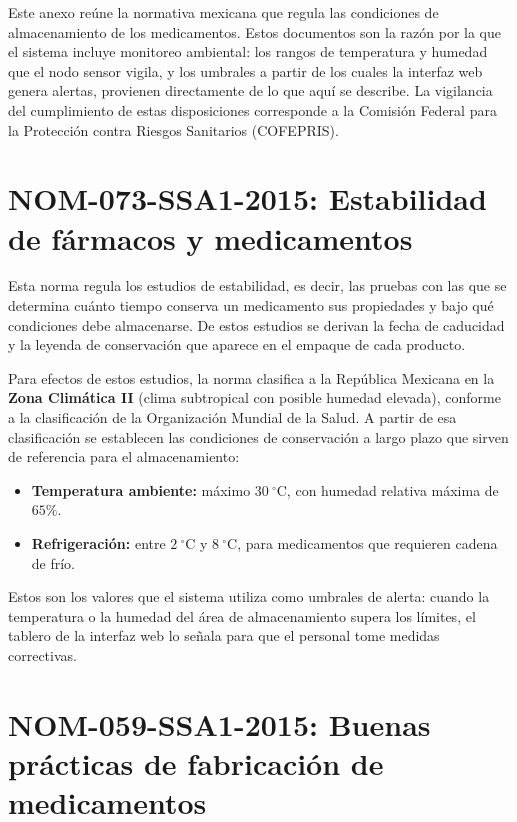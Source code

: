 
\renewcommand{\thesection}{A2.\arabic{section}}
\setcounter{section}{0}

Este anexo reúne la normativa mexicana que regula las condiciones de almacenamiento de los medicamentos. Estos documentos son la razón por la que el sistema incluye monitoreo ambiental: los rangos de temperatura y humedad que el nodo sensor vigila, y los umbrales a partir de los cuales la interfaz web genera alertas, provienen directamente de lo que aquí se describe. La vigilancia del cumplimiento de estas disposiciones corresponde a la Comisión Federal para la Protección contra Riesgos Sanitarios (COFEPRIS).

\section{NOM-073-SSA1-2015: Estabilidad de fármacos y medicamentos}

Esta norma \cite{nom073} regula los estudios de estabilidad, es decir, las pruebas con las que se determina cuánto tiempo conserva un medicamento sus propiedades y bajo qué condiciones debe almacenarse. De estos estudios se derivan la fecha de caducidad y la leyenda de conservación que aparece en el empaque de cada producto.

Para efectos de estos estudios, la norma clasifica a la República Mexicana en la \textbf{Zona Climática II} (clima subtropical con posible humedad elevada), conforme a la clasificación de la Organización Mundial de la Salud. A partir de esa clasificación se establecen las condiciones de conservación a largo plazo que sirven de referencia para el almacenamiento:

\begin{itemize}
    \item \textbf{Temperatura ambiente:} máximo $30~^{\circ}\text{C}$, con humedad relativa máxima de $65\%$.
    \item \textbf{Refrigeración:} entre $2~^{\circ}\text{C}$ y $8~^{\circ}\text{C}$, para medicamentos que requieren cadena de frío.
\end{itemize}

Estos son los valores que el sistema utiliza como umbrales de alerta: cuando la temperatura o la humedad del área de almacenamiento supera los límites, el tablero de la interfaz web lo señala para que el personal tome medidas correctivas.

\section{NOM-059-SSA1-2015: Buenas prácticas de fabricación de medicamentos}

